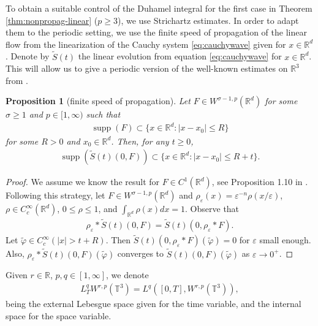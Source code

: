 \documentclass[a4paper, reqno, 11pt]{amsart}
\newtheorem{proposition}[theorem]{Proposition}
\theoremstyle{definition}
\DeclareMathOperator\supp{supp}
\begin{document}
	
	To obtain a suitable control of the Duhamel integral for the first case in Theorem \ref{thm:nonpropag-linear} ($p \geq 3$), we use Strichartz estimates. In order to adapt them to the periodic setting, we use the finite speed of propagation of the linear flow from the linearization of the Cauchy system \eqref{eq:cauchywave} given for $x \in \mathbb{R}^d$. Denote by $\tilde{S}(t)$ the linear evolution from equation \eqref{eq:cauchywave} for $x \in \mathbb{R}^d$. This will allow us to give a periodic version of the well-known estimates on $\mathbb{R}^3$ from \cite{GV95}.
\begin{proposition}[finite speed of propagation]\label{prop:finite-speed-prop}
Let $F \in W^{\sigma-1,p}(\mathbb{R}^d)$ for some $\sigma \geq 1$ and $p \in [1,\infty)$ such that
\begin{align*}
\supp(F) \subset \{x \in \mathbb{R}^d : |x - x_0| \leq R\}
\end{align*}
for some $R > 0$ and $x_0 \in \mathbb{R}^d$. Then, for any $t \geq 0$,
\begin{align*}
\supp(\tilde{S}(t)(0,F)) \subset \{x \in \mathbb{R}^d : |x - x_0| \leq R + t\}.
\end{align*}
\end{proposition}
\begin{proof}
We assume we know the result for $F \in C^1(\mathbb{R}^d)$, see Proposition 1.10 in \cite{Tzvetkov2019-notes}. Following this strategy, let $F \in W^{\sigma-1,p}(\mathbb{R}^d)$ and $\rho_{\varepsilon}(x)  = \varepsilon^{-n} \rho(x/\varepsilon)$, $\rho \in C^{\infty}_c(\mathbb{R}^d)$, $0 \leq \rho \leq 1$, and $\int_{\mathbb{R}^d} \rho(x) dx = 1$. Observe that
\begin{align*}
\rho_{\varepsilon} \ast \tilde{S}(t)(0,F) = \tilde{S}(t)(0,\rho_{\varepsilon} \ast F).
\end{align*}
Let $\tilde{\varphi} \in C^{\infty}_c(|x| > t + R)$. Then $\tilde{S}(t)(0,\rho_{\varepsilon} \ast F)(\tilde{\varphi}) = 0$ for $\varepsilon$ small enough. Also, $\rho_{\varepsilon} \ast \tilde{S}(t)(0,F)(\tilde{\varphi})$ converges to $\tilde{S}(t)(0,F)(\tilde{\varphi})$ as $\varepsilon \rightarrow 0^+$.
\end{proof}
Given $r \in \mathbb{R}$, $p,q \in [1,\infty]$, we denote 
\begin{align*}
L^q_T W^{r,p}(\mathbb{T}^3) = L^q([0,T] , W^{r,p}(\mathbb{T}^3)),
\end{align*}
being the external Lebesgue space given for the time variable, and the internal space for the space variable. 
\end{document}

